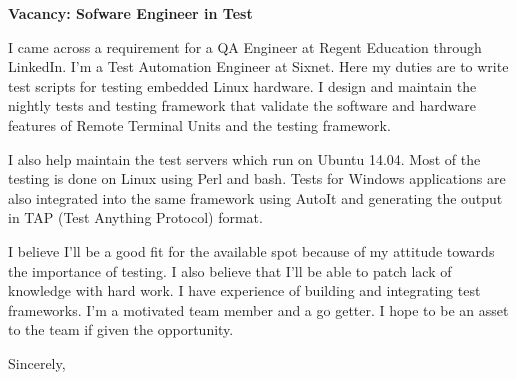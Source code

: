 \documentclass[14pt]{extletter}
\begin{document}
\begin{letter}{}

\opening{\textbf{Vacancy: Sofware Engineer in Test}}
 
I came across a requirement for a QA Engineer at Regent Education through
LinkedIn. I'm a Test Automation Engineer at Sixnet. Here my duties are to write
test scripts for testing embedded Linux hardware. I design and maintain the
nightly tests and testing framework that validate the software and hardware
features of Remote Terminal Units and the testing framework.

I also help maintain the test servers which run on Ubuntu 14.04. Most of the
testing is done on Linux using Perl and bash. Tests for Windows applications
are also integrated into the same framework using AutoIt and generating the
output in TAP (Test Anything Protocol) format.

I believe I'll be a good fit for the available spot because of my attitude
towards the importance of testing. I also believe that I'll be able to patch
lack of knowledge with hard work. I have experience of building and integrating
test frameworks. I'm a motivated team member and a go getter. I hope to be an
asset to the team if given the opportunity.

\vspace{2\parskip} %
\closing{Sincerely,}
\vspace{2\parskip} %

\end{letter}
 
\end{document}
